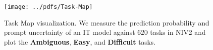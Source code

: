 \begin{figure}
    \centering
    \texttt{[image: ../pdfs/Task-Map]}
    \vspace{-2em}
    \caption{\footnotesize
    Task Map visualization. We measure the prediction probability and prompt uncertainty of an IT model against 620 tasks in NIV2 and plot the \textbf{Ambiguous}, \textbf{Easy}, and \textbf{Difficult} tasks.
    }
    \vspace{-2em}
    \label{fig:task-map}
\end{figure}